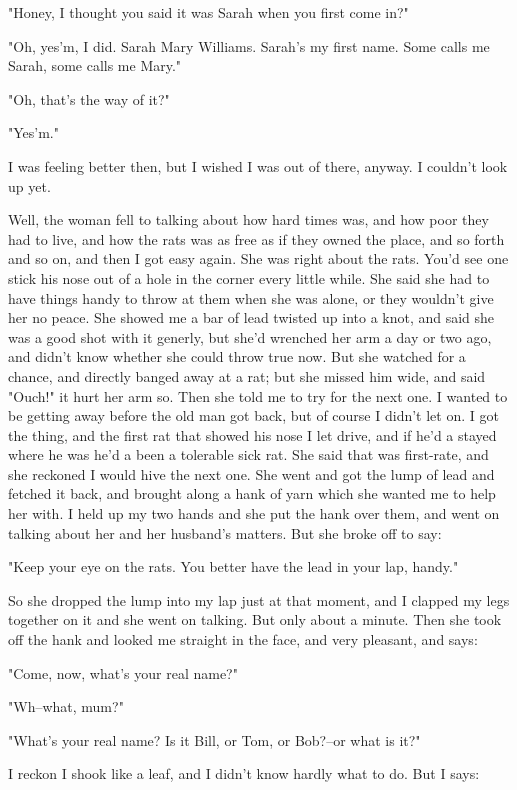 "Honey, I thought you said it was Sarah when you first come in?"

"Oh, yes'm, I did.  Sarah Mary Williams.  Sarah's my first name.  Some
calls me Sarah, some calls me Mary."

"Oh, that's the way of it?"

"Yes'm."

I was feeling better then, but I wished I was out of there, anyway.  I
couldn't look up yet.

Well, the woman fell to talking about how hard times was, and how poor
they had to live, and how the rats was as free as if they owned the
place, and so forth and so on, and then I got easy again.  She was right
about the rats. You'd see one stick his nose out of a hole in the corner
every little while.  She said she had to have things handy to throw at
them when she was alone, or they wouldn't give her no peace.  She showed
me a bar of lead twisted up into a knot, and said she was a good shot
with it generly, but she'd wrenched her arm a day or two ago, and didn't
know whether she could throw true now.  But she watched for a chance, and
directly banged away at a rat; but she missed him wide, and said "Ouch!"
it hurt her arm so.  Then she told me to try for the next one.  I wanted
to be getting away before the old man got back, but of course I didn't
let on.  I got the thing, and the first rat that showed his nose I let
drive, and if he'd a stayed where he was he'd a been a tolerable sick
rat.  She said that was first-rate, and she reckoned I would hive the
next one.  She went and got the lump of lead and fetched it back, and
brought along a hank of yarn which she wanted me to help her with.  I
held up my two hands and she put the hank over them, and went on talking
about her and her husband's matters.  But she broke off to say:

"Keep your eye on the rats.  You better have the lead in your lap,
handy."

So she dropped the lump into my lap just at that moment, and I clapped my
legs together on it and she went on talking.  But only about a minute.
Then she took off the hank and looked me straight in the face, and very
pleasant, and says:

"Come, now, what's your real name?"

"Wh--what, mum?"

"What's your real name?  Is it Bill, or Tom, or Bob?--or what is it?"

I reckon I shook like a leaf, and I didn't know hardly what to do.  But I
says:

